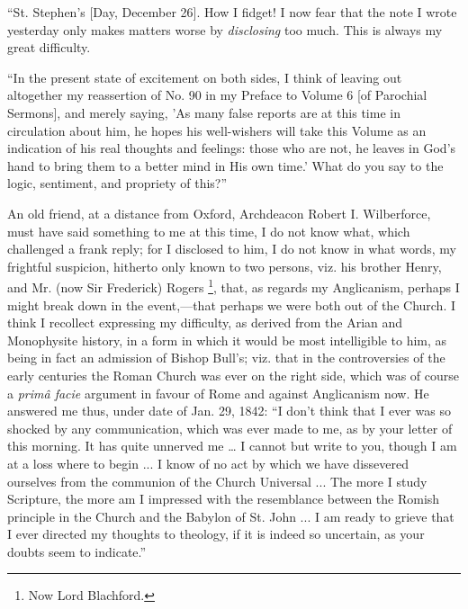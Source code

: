 ``St. Stephen's [Day, December 26]. How I fidget! I
now fear that the note I wrote yesterday only makes matters worse by \emph{disclosing}
too much. This is always my great difficulty.

``In the present state of excitement on both sides, I think of leaving
out altogether my reassertion of No. 90 in my Preface to Volume 6 [of
Parochial Sermons], and merely saying, 'As many false
reports are at this time in circulation about him, he hopes his
well-wishers will take this Volume as an indication of his real thoughts
and feelings: those who are not, he leaves in God's hand to bring them
to a better mind in His own time.' What do you say to the logic,
sentiment, and propriety of this?''

An old friend, at a distance from Oxford, Archdeacon Robert I. Wilberforce,
must have said something to me at this
time, I do not know what, which challenged a frank reply; for I
disclosed to him, I do not know in what words, my frightful suspicion,
hitherto only known to two persons, viz. his brother Henry, and Mr.
(now Sir Frederick) Rogers \footnote{Now Lord Blachford.}, that, as regards my Anglicanism, perhaps
I might break down in the event,—that perhaps we were both out
of the Church. I think I recollect expressing my difficulty, as
derived from the Arian and Monophysite history, in a form in which it
would be most intelligible to him, as being in fact an admission of
Bishop Bull's; viz. that in the controversies of the early centuries the
Roman Church was ever on the right side, which was of course a \emph{primâ
facie} argument in favour of Rome and against Anglicanism
now. He answered me thus, under date of Jan. 29, 1842: ``I don't
think that I ever was so shocked by any communication, which was ever
made to me, as by your letter of this morning. It has quite unnerved me
… I cannot but write to you, though I am at a loss where to begin ...
I know of no act by which we have dissevered ourselves from the
communion of the Church Universal ... The more I study Scripture, the
more am I impressed with the resemblance between the Romish principle in
the Church and the Babylon of St. John ... I am ready to grieve that I
ever directed my thoughts to theology, if it is indeed so uncertain, as
your doubts seem to indicate.''


